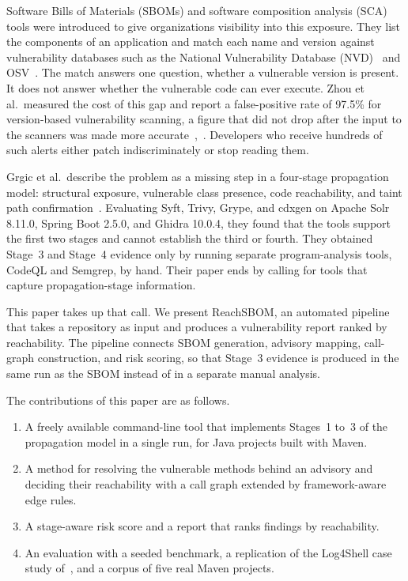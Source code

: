\documentclass[conference]{IEEEtran}
\begin{document}
Software Bills of Materials (SBOMs) and software composition analysis (SCA) tools were introduced to give organizations visibility into this exposure. They list the components of an application and match each name and version against vulnerability databases such as the National Vulnerability Database (NVD)~\cite{nvd} and OSV~\cite{osv}. The match answers one question, whether a vulnerable version is present. It does not answer whether the vulnerable code can ever execute. Zhou et al.\ measured the cost of this gap and report a false-positive rate of 97.5\% for version-based vulnerability scanning, a figure that did not drop after the input to the scanners was made more accurate~\cite{zhou},~\cite{grgic}. Developers who receive hundreds of such alerts either patch indiscriminately or stop reading them.

Grgic et al.\ describe the problem as a missing step in a four-stage propagation model: structural exposure, vulnerable class presence, code reachability, and taint path confirmation~\cite{grgic}. Evaluating Syft, Trivy, Grype, and cdxgen on Apache Solr 8.11.0, Spring Boot 2.5.0, and Ghidra 10.0.4, they found that the tools support the first two stages and cannot establish the third or fourth. They obtained Stage~3 and Stage~4 evidence only by running separate program-analysis tools, CodeQL and Semgrep, by hand. Their paper ends by calling for tools that capture propagation-stage information.

This paper takes up that call. We present ReachSBOM, an automated pipeline that takes a repository as input and produces a vulnerability report ranked by reachability. The pipeline connects SBOM generation, advisory mapping, call-graph construction, and risk scoring, so that Stage~3 evidence is produced in the same run as the SBOM instead of in a separate manual analysis.

The contributions of this paper are as follows.
\begin{enumerate}
\item A freely available command-line tool that implements Stages~1 to~3 of the propagation model in a single run, for Java projects built with Maven.
\item A method for resolving the vulnerable methods behind an advisory and deciding their reachability with a call graph extended by framework-aware edge rules.
\item A stage-aware risk score and a report that ranks findings by reachability.
\item An evaluation with a seeded benchmark, a replication of the Log4Shell case study of~\cite{grgic}, and a corpus of five real Maven projects.
\end{enumerate}
\end{document}
